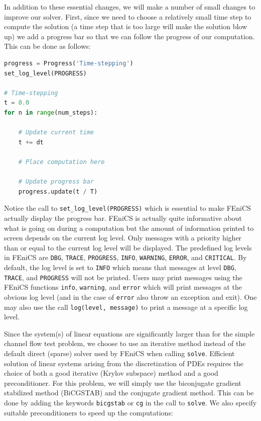 \documentclass[graybox,envcountchap,sectrefs,final]{svmonodo}
\newenvironment{notice_mdfboxadmon}[1][]{
\begin{notice_mdfboxmdframed}[frametitle=#1]
}
{
\end{notice_mdfboxmdframed}
}
\begin{document}

In addition to these essential changes, we will make a number of small
changes to improve our solver. First, since we need to choose a
relatively small time step to compute the solution (a time step that
is too large will make the solution blow up) we add a progress bar so
that we can follow the progress of our computation. This can be done
as follows:


\begin{lstlisting}[language=Python,style=graycolor]
progress = Progress('Time-stepping')
set_log_level(PROGRESS)

# Time-stepping
t = 0.0
for n in range(num_steps):

    # Update current time
    t += dt

    # Place computation here

    # Update progress bar
    progress.update(t / T)
\end{lstlisting}


\begin{notice_mdfboxadmon}
Notice the call to \Verb!set_log_level(PROGRESS)! which is essential to
make FEniCS actually display the progress bar. FEniCS is actually
quite informative about what is going on during a computation but the
amount of information printed to screen depends on the current log
level. Only messages with a priority higher than or equal to the
current log level will be displayed. The predefined log levels in
FEniCS are
\texttt{DBG},
\texttt{TRACE},
\texttt{PROGRESS},
\texttt{INFO},
\texttt{WARNING},
\texttt{ERROR}, and
\texttt{CRITICAL}. By default, the log level is set to \texttt{INFO} which means
that messages at level \texttt{DBG}, \texttt{TRACE}, and \texttt{PROGRESS} will not be
printed. Users may print messages using the FEniCS functions \texttt{info},
\texttt{warning}, and \texttt{error} which will print messages at the obvious log
level (and in the case of \texttt{error} also throw an exception and
exit). One may also use the call \texttt{log(level, message)} to print a
message at a specific log level.
\end{notice_mdfboxadmon} %



Since the system(s) of linear equations are significantly larger than
for the simple channel flow test problem, we choose to use an
iterative method instead of the default direct (sparse) solver used by
FEniCS when calling \texttt{solve}. Efficient solution of linear systems
arising from the discretization of PDEs requires the choice of both a
good iterative (Krylov subspace) method and a good
preconditioner. For this problem, we will simply use the biconjugate
gradient stabilized method (BiCGSTAB) and the conjugate gradient method. This can be done by adding the
keywords \texttt{bicgstab} or \texttt{cg} in the call to \texttt{solve}. We also specify
suitable preconditioners to speed up the computations:
\end{document}
